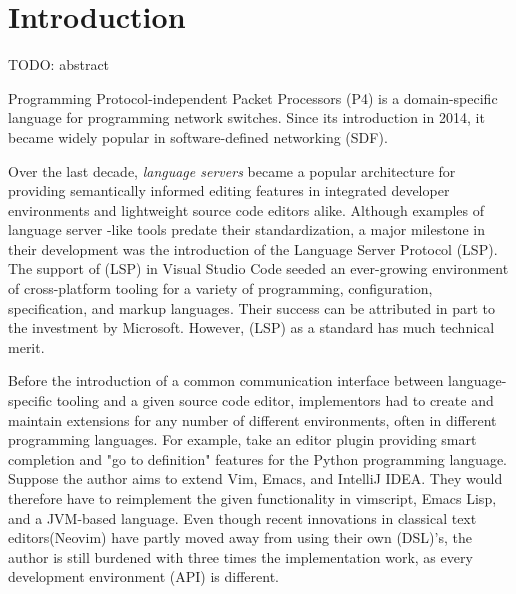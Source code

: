 \chapter*{Introduction}
\setcounter{page}{1}

\begin{chapterabstract}
	TODO: abstract
\end{chapterabstract}

Programming Protocol-independent Packet Processors (P4) is a domain-specific
language for programming network switches. Since its introduction in
2014\cite{p4original}, it became widely popular in software-defined networking
(SDF).




Over the last decade, \textit{language servers} became a popular architecture
for providing semantically informed editing features in integrated developer
environments and lightweight source code editors alike. Although examples of
language server -like tools predate their standardization, a major milestone in
their development was the introduction of the Language Server Protocol (LSP).
The support of (LSP) in Visual Studio Code seeded an ever-growing environment of
cross-platform tooling for a variety of programming, configuration,
specification, and markup languages. Their success can be attributed in part to
the investment by Microsoft. However, (LSP) as a standard has much technical
merit.

Before the introduction of a common communication interface between
language-specific tooling and a given source code editor, implementors had to
create and maintain extensions for any number of different environments, often
in different programming languages. For example, take an editor plugin providing
smart completion and "go to definition" features for the Python programming
language. Suppose the author aims to extend Vim, Emacs, and IntelliJ IDEA. They
would therefore have to reimplement the given functionality in vimscript, Emacs
Lisp, and a JVM-based language. Even though recent innovations in classical text
editors(Neovim) have partly moved away from using their own (DSL)'s, the author
is still burdened with three times the implementation work, as every development
environment (API) is different.

